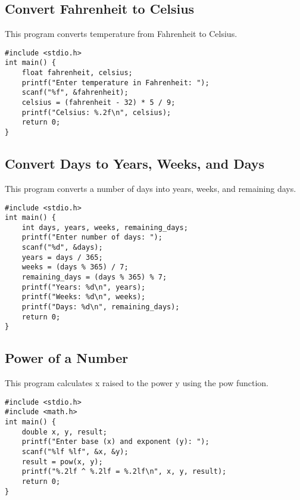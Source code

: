\documentclass[a4paper,12pt]{article}
\begin{document}
\newpage

\subsection{Convert Fahrenheit to Celsius}
This program converts temperature from Fahrenheit to Celsius.

\begin{lstlisting}[caption={Convert Fahrenheit to Celsius}]
#include <stdio.h>
int main() {
    float fahrenheit, celsius;
    printf("Enter temperature in Fahrenheit: ");
    scanf("%f", &fahrenheit);
    celsius = (fahrenheit - 32) * 5 / 9;
    printf("Celsius: %.2f\n", celsius);
    return 0;
}
\end{lstlisting}

\newpage

\subsection{Convert Days to Years, Weeks, and Days}
This program converts a number of days into years, weeks, and remaining days.

\begin{lstlisting}[caption={Convert Days to Years, Weeks, and Days}]
#include <stdio.h>
int main() {
    int days, years, weeks, remaining_days;
    printf("Enter number of days: ");
    scanf("%d", &days);
    years = days / 365;
    weeks = (days % 365) / 7;
    remaining_days = (days % 365) % 7;
    printf("Years: %d\n", years);
    printf("Weeks: %d\n", weeks);
    printf("Days: %d\n", remaining_days);
    return 0;
}
\end{lstlisting}

\newpage

\subsection{Power of a Number}
This program calculates x raised to the power y using the pow function.

\begin{lstlisting}[caption={Power of a Number}]
#include <stdio.h>
#include <math.h>
int main() {
    double x, y, result;
    printf("Enter base (x) and exponent (y): ");
    scanf("%lf %lf", &x, &y);
    result = pow(x, y);
    printf("%.2lf ^ %.2lf = %.2lf\n", x, y, result);
    return 0;
}
\end{lstlisting}
\end{document}
